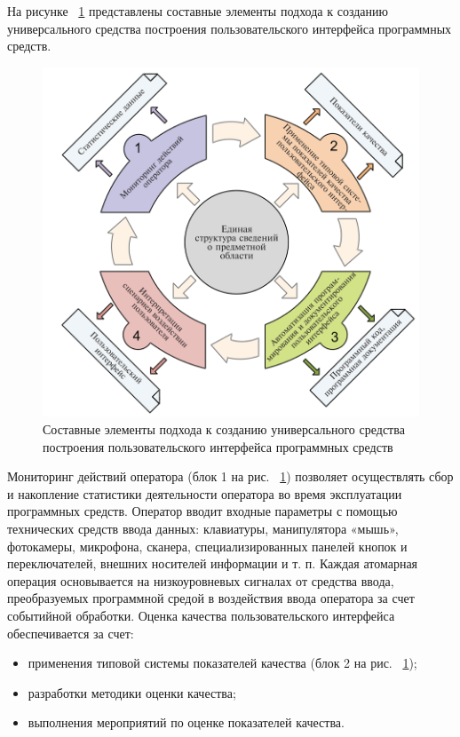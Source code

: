 \def\notedate{2022.10.15}
\def\currentauthor{Василян А.Р. (РК6-73Б)}

	На рисунке ~\ref{scheme1} представлены составные элементы подхода к созданию универсального средства построения пользовательского интерфейса программных средств.

\begin{figure}[!ht]
  \centering
  \includegraphics[scale=0.8]{ResearchNotes/rndhpc_not_gui_2022_10_15/scheme1.png}
  \caption{Составные элементы подхода к созданию универсального средства построения пользовательского интерфейса программных средств}
  \label{scheme1}
\end{figure}

	Мониторинг действий оператора (блок 1 на рис. ~\ref{scheme1}) позволяет осуществлять сбор и накопление статистики деятельности оператора во время эксплуатации программных средств. Оператор вводит входные параметры с помощью технических средств ввода данных: клавиатуры, манипулятора «мышь», фотокамеры, микрофона, сканера, специализированных панелей кнопок и переключателей, внешних носителей информации и т. п. Каждая атомарная операция основывается на низкоуровневых сигналах от средства ввода, преобразуемых программной средой в воздействия ввода оператора за счет событийной обработки.
Оценка качества пользовательского интерфейса обеспечивается за счет:
\begin{itemize}
	\item применения типовой системы показателей качества (блок 2 на рис. ~\ref{scheme1});
	\item разработки методики оценки качества;
	\item выполнения мероприятий по оценке показателей качества.
\end{itemize}

